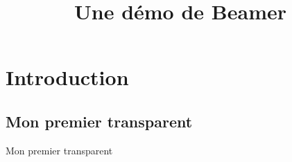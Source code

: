 \documentclass[a4paper, dvipsnames]{beamer}
\title{Une démo de Beamer}
\begin{document}
\section{Introduction}

\begin{frame}
	\titlepage
\end{frame}    

\subsection{Mon premier transparent}
\begin{frame}{Mon premier transparent}
	\begin{columns}[c]

\end{columns}
\end{frame}
\end{document}
